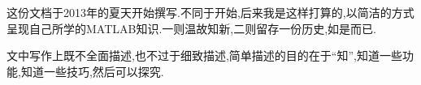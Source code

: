 这份文档于2013年的夏天开始撰写.不同于开始,后来我是这样打算的,以简洁的方式呈现自己所学的MATLAB知识.一则温故知新,二则留存一份历史,如是而已.\par
文中写作上既不全面描述,也不过于细致描述,简单描述的目的在于“知”,知道一些功能,知道一些技巧,然后可以探究.
